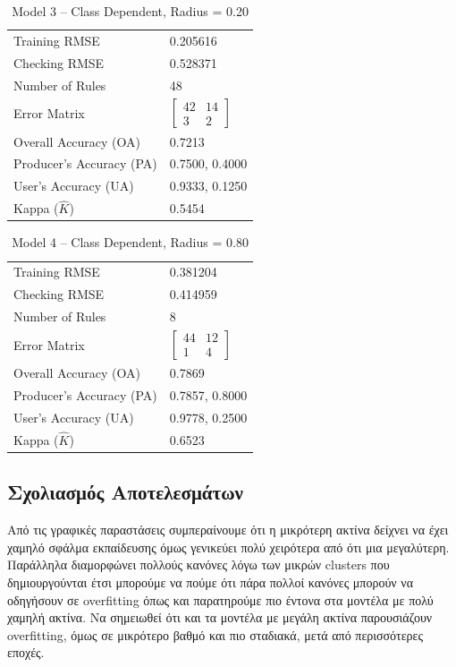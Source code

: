 \documentclass[12pt]{report}
\begin{document}
\begin{table}[H]
    \centering
    \caption{Model 3 -- Class Dependent, Radius = 0.20}
    \begin{tabular}{ll}
    \hline
    Training RMSE & 0.205616 \\
    Checking RMSE & 0.528371 \\
    Number of Rules & 48 \\
    Error Matrix & $\begin{bmatrix} 42 & 14 \\ 3 & 2 \end{bmatrix}$ \\
    Overall Accuracy (OA) & 0.7213 \\
    Producer's Accuracy (PA) & 0.7500, 0.4000 \\
    User's Accuracy (UA) & 0.9333, 0.1250 \\
    Kappa ($\hat{K}$) & 0.5454 \\
    \hline
    \end{tabular}
\end{table}

\begin{table}[H]
    \centering
    \caption{Model 4 -- Class Dependent, Radius = 0.80}
    \begin{tabular}{ll}
    \hline
    Training RMSE & 0.381204 \\
    Checking RMSE & 0.414959 \\
    Number of Rules & 8 \\
    Error Matrix & $\begin{bmatrix} 44 & 12 \\ 1 & 4 \end{bmatrix}$ \\
    Overall Accuracy (OA) & 0.7869 \\
    Producer's Accuracy (PA) & 0.7857, 0.8000 \\
    User's Accuracy (UA) & 0.9778, 0.2500 \\
    Kappa ($\hat{K}$) & 0.6523 \\
    \hline
    \end{tabular}
\end{table}

\subsection{Σχολιασμός Αποτελεσμάτων}
Από τις γραφικές παραστάσεις συμπεραίνουμε ότι η μικρότερη ακτίνα δείχνει να έχει χαμηλό σφάλμα εκπαίδευσης όμως γενικεύει πολύ χειρότερα από ότι μια μεγαλύτερη. Παράλληλα διαμορφώνει πολλούς κανόνες λόγω των μικρών clusters που δημιουργούνται έτσι μπορούμε να πούμε ότι πάρα πολλοί κανόνες μπορούν να οδηγήσουν σε overfitting όπως και παρατηρούμε πιο έντονα στα μοντέλα με πολύ χαμηλή ακτίνα. Να σημειωθεί ότι και τα μοντέλα με μεγάλη ακτίνα παρουσιάζουν overfitting, όμως σε μικρότερο βαθμό και πιο σταδιακά, μετά από περισσότερες εποχές.
\end{document}

